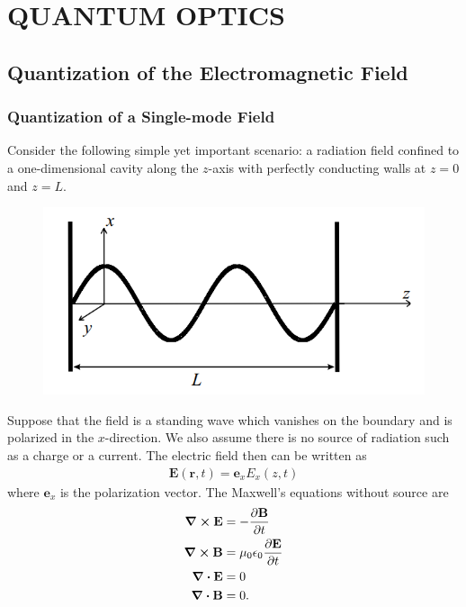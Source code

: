 \documentclass{book}
\theoremstyle{definition}
\newcommand{\p}{\partial}
\newcommand{\f}[2]{\frac{#1}{#2}}
\begin{document}
\newpage






























\chapter{QUANTUM OPTICS}

\newpage


\section{Quantization of the Electromagnetic Field}

\subsection{Quantization of a Single-mode Field}

Consider the following simple yet important scenario: a radiation field confined to a one-dimensional cavity along the $z$-axis with perfectly conducting walls at $z=0$ and $z=L$. 
\begin{figure}[!htb]
	\centering
	\includegraphics[scale=0.5]{em}
\end{figure}


Suppose that the field is a standing wave which vanishes on the boundary and is polarized in the $x$-direction. We also assume there is no source of radiation such as a charge or a current. The electric field then can be written as
\begin{align}
\mathbf{E}(\mathbf{r},t) = \mathbf{e}_xE_x(z,t)
\end{align}
where $\mathbf{e}_x$ is the polarization vector. The Maxwell's equations without source are
\begin{align}
\curl{\mathbf{E}} &= -\f{\p \mathbf{B}}{\p t}\\
\curl{\mathbf{B}} &= \mu_0\epsilon_0\f{\p \mathbf{E}}{\p t}\\
\div{\mathbf{E}} &= 0\\
\div{\mathbf{B}} &= 0.
\end{align}
\end{document}
